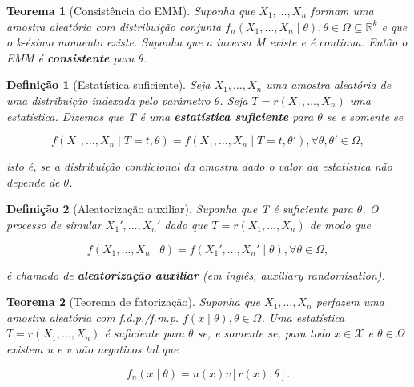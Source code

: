 \documentclass{article}
\newtheorem{theorem}{Teorema}
\newtheorem{definition}{Definição}
\begin{document}
\begin{theorem}[Consistência do EMM]
Suponha que $X_1, \ldots, X_n$ formam uma amostra aleatória com distribuição conjunta  $f_n (X_1, \ldots, X_n \mid \theta), \theta \in \Omega \subseteq \mathbb{R}^k$ e que o k-ésimo momento existe. Suponha que a inversa M existe e é continua. Então o EMM é \textbf{consistente} para $\theta$.
\end{theorem}

\begin{definition}[Estatística suficiente]
Seja $X_1, \ldots, X_n$ uma amostra aleatória de uma distribuição indexada pelo parâmetro $\theta$. Seja $T = r(X_1, \ldots, X_n)$ uma estatística. Dizemos que T é uma \textbf{estatística suficiente} para $\theta$ se e somente se

\begin{equation}
    f(X_1, \ldots, X_n \mid T = t, \theta) = f(X_1, \ldots, X_n \mid T = t, \theta'), \forall \theta, \theta' \in \Omega,
\end{equation}

isto é, se a distribuição condicional da amostra dado o valor da estatística não depende de $\theta$.
\end{definition}

\begin{definition}[Aleatorização auxiliar]
 Suponha que T é suficiente para $\theta$. O processo de simular $X_1', \ldots, X_n'$ dado que $T = r(X_1, \ldots, X_n)$ de modo que 
 
 \begin{equation}
     f(X_1, \ldots, X_n \mid \theta) = f(X_1', \ldots, X_n' \mid \theta), \forall \theta \in \Omega,
 \end{equation}
 
 é chamado de \textbf{aleatorização auxiliar} (em inglês, auxiliary randomisation).
\end{definition}

\begin{theorem}[Teorema de fatorização]\label{teo:fatorizacao}
Suponha que $X_1, \ldots, X_n$ perfazem uma amostra aleatória com f.d.p./f.m.p. $f(x \mid \theta), \theta \in \Omega$. Uma estatística $T = r(X_1, \ldots, X_n)$ é suficiente para $\theta$ se, e somente se, para todo $x \in \mathcal{X}$ e $\theta \in \Omega$ existem u e v não negativos tal que

\begin{equation}
    f_n(x \mid \theta) = u(x) v[r(x), \theta].
\end{equation}
\end{theorem}
\end{document}
